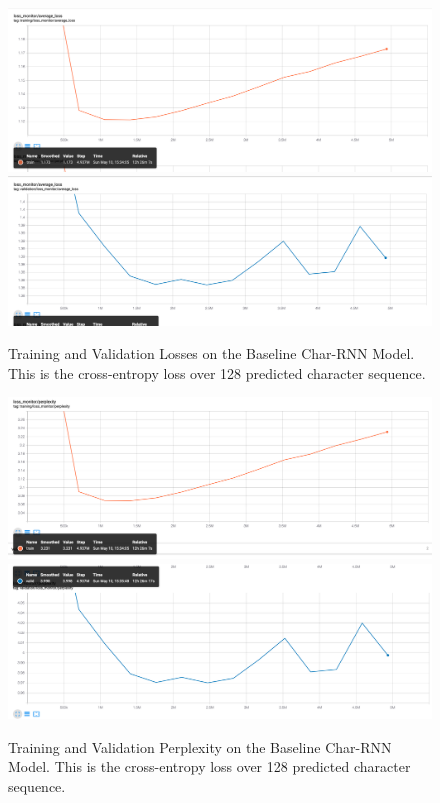 \documentclass{article}
\begin{document}
\begin{figure}[!ht]
    \centering
    \includegraphics[scale=0.3]{figures/char-rnn/train_loss.png}
    \includegraphics[scale=0.3]{figures/char-rnn/validation_loss.png}
    \caption{Training and Validation Losses on the Baseline Char-RNN Model. This is the cross-entropy loss over 128 predicted character sequence.}
    \label{fig:char_rnn_loss}
\end{figure}

\begin{figure}[!ht]
    \centering
    \includegraphics[scale=0.3]{figures/char-rnn/train_perplexity.png}
    \includegraphics[scale=0.3]{figures/char-rnn/validation_perplexity.png}
    \caption{Training and Validation Perplexity on the Baseline Char-RNN Model. This is the cross-entropy loss over 128 predicted character sequence.}
    \label{fig:char_rnn_perplexity}
\end{figure}
\end{document}
